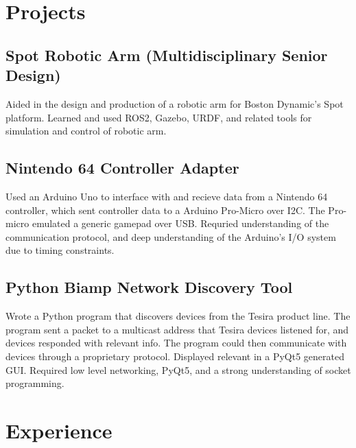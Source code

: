 \documentclass{article}
\begin{document}
\section{Projects}

    \subsection{Spot Robotic Arm (Multidisciplinary Senior Design)}
    Aided in the design and production of a robotic arm for Boston Dynamic's Spot platform.
    Learned and used ROS2, Gazebo, URDF, and related tools for simulation and
    control of robotic arm.

    \subsection{Nintendo 64 Controller Adapter}
    Used an Arduino Uno to interface with and recieve data from a Nintendo 64
    controller, which sent controller data to a Arduino Pro-Micro over I2C. The
    Pro-micro emulated a generic gamepad over USB. Requried understanding of the
    communication protocol, and deep understanding of the Arduino's I/O system due 
    to timing constraints.

    \subsection{Python Biamp Network Discovery Tool}
    Wrote a Python program that discovers devices from the Tesira
    product line. The program sent a packet to a multicast address that Tesira
    devices listened for, and devices responded with relevant info. The program
    could then communicate with devices through a proprietary
    protocol. Displayed relevant in a PyQt5 generated GUI. Required low level 
    networking, PyQt5, and a strong understanding of socket programming.


\section{Experience}
\end{document}
